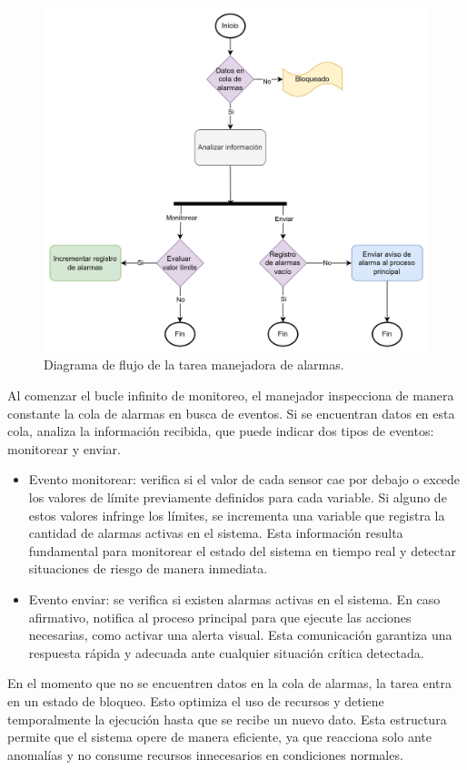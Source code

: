 \vspace{1cm}
\begin{figure}[htbp]
	\centering
	\includegraphics[width=1.0\textwidth, height=0.6\textheight]{./Figures/DdF_tarea_manejador_alarmas.png}
	\caption{Diagrama de flujo de la tarea manejadora de alarmas.}
	\label{fig:DdF_tarea_manejador_alarmas}
\end{figure}
\vspace{1cm}

Al comenzar el bucle infinito de monitoreo, el manejador inspecciona de manera constante la cola de alarmas en busca de eventos. Si se encuentran datos en esta cola, analiza la información recibida, que puede indicar dos tipos de eventos: monitorear y enviar.

\begin{itemize}
\item Evento monitorear: verifica si el valor de cada sensor cae por debajo o excede los valores de límite previamente definidos para cada variable. Si alguno de estos valores infringe los límites, se incrementa una variable que registra la cantidad de alarmas activas en el sistema. Esta información resulta fundamental para monitorear el estado del sistema en tiempo real y detectar situaciones de riesgo de manera inmediata.
\item Evento enviar: se verifica si existen alarmas activas en el sistema. En caso afirmativo, notifica al proceso principal para que ejecute las acciones necesarias, como activar una alerta visual. Esta comunicación garantiza una respuesta rápida y adecuada ante cualquier situación crítica detectada.
\end{itemize}

En el momento que no se encuentren datos en la cola de alarmas, la tarea entra en un estado de bloqueo. Esto optimiza el uso de recursos y detiene temporalmente la ejecución hasta que se recibe un nuevo dato. Esta estructura permite que el sistema opere de manera eficiente, ya que reacciona solo ante anomalías y no consume recursos innecesarios en condiciones normales.

